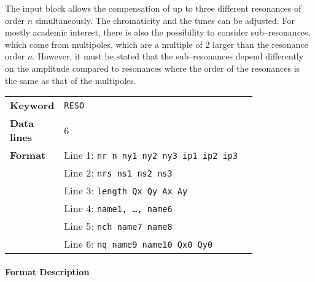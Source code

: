The input block allows the compensation of up to three different resonances of order $n$ simultaneously.
The chromaticity and the tunes can be adjusted.
For mostly academic interest, there is also the possibility to consider sub--resonances, which come from multipoles, which are a multiple of 2 larger than the resonance order $n$.
However, it must be stated that the sub--resonances depend differently on the amplitude compared to resonances where the order of the resonances is the same as that of the multipoles.

\bigskip
\begin{tabular}{@{}lp{0.8\linewidth}}
    \textbf{Keyword}    & \texttt{RESO} \\
    \textbf{Data lines} & 6 \\
    \textbf{Format}     & Line 1: \texttt{nr n ny1 ny2 ny3 ip1 ip2 ip3} \\
                        & Line 2: \texttt{nrs ns1 ns2 ns3} \\
                        & Line 3: \texttt{length Qx Qy Ax Ay} \\
                        & Line 4: \texttt{name1, \dots, name6} \\
                        & Line 5: \texttt{nch name7 name8} \\
                        & Line 6: \texttt{nq name9 name10 Qx0 Qy0}
\end{tabular}

\paragraph{Format Description}~

